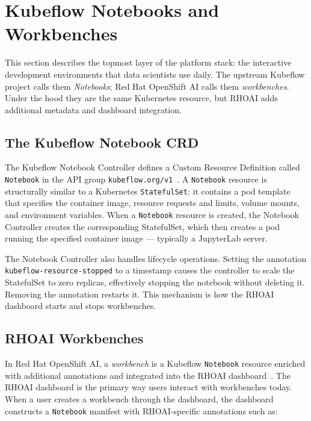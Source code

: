 \documentclass[
  digital,     %
  oneside,     %
  nosansbold,  %
  nocolorbold, %
  lof,         %
  lot,         %
]{fithesis4}
\begin{document}
\section{Kubeflow Notebooks and Workbenches}
\label{sec:notebooks-workbenches}

This section describes the topmost layer of the platform stack: the interactive
development environments that data scientists use daily. The upstream Kubeflow
project calls them \emph{Notebooks}; Red Hat OpenShift AI calls them
\emph{workbenches}. Under the hood they are the same Kubernetes resource, but
RHOAI adds additional metadata and dashboard integration.

\subsection{The Kubeflow Notebook CRD}
\label{subsec:notebook-crd}

The Kubeflow Notebook Controller defines a Custom Resource Definition called
\texttt{Notebook} in the API group
\texttt{kubeflow.org/v1}~\parencite{kubeflow-notebook-crd}. A \texttt{Notebook}
resource is structurally similar to a Kubernetes \texttt{StatefulSet}: it
contains a pod template that specifies the container image, resource requests
and limits, volume mounts, and environment variables. When a \texttt{Notebook}
resource is created, the Notebook Controller creates the corresponding
StatefulSet, which then creates a pod running the specified container image
--- typically a JupyterLab server.

The Notebook Controller also handles lifecycle operations. Setting the
annotation \texttt{kubeflow-resource-stopped} to a timestamp causes the
controller to scale the StatefulSet to zero replicas, effectively stopping the
notebook without deleting it. Removing the annotation restarts it. This
mechanism is how the RHOAI dashboard starts and stops workbenches.

\subsection{RHOAI Workbenches}
\label{subsec:rhoai-workbenches}

In Red Hat OpenShift AI, a \emph{workbench} is a Kubeflow \texttt{Notebook}
resource enriched with additional annotations and integrated into the RHOAI
dashboard~\parencite{rhoai-workbenches}. The RHOAI dashboard is the primary
way users interact with workbenches today. When a user creates a workbench
through the dashboard, the dashboard constructs a \texttt{Notebook} manifest with
RHOAI-specific annotations such as:
\end{document}
